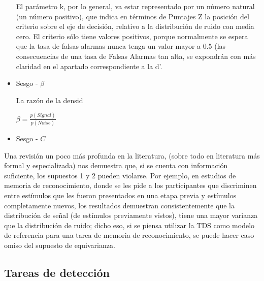 \begin{itemize}
 El parámetro k, por lo general, va estar representado por un número natural (un número positivo), que indica en términos de Puntajes Z  la posición del criterio sobre el eje de decisión, relativo a la distribución de ruido con media cero. El criterio sólo tiene valores positivos, porque normalmente se espera que la tasa de falsas alarmas nunca tenga un valor mayor a 0.5 (las consecuencias de una tasa de Falsas Alarmas tan alta, se expondrán con más claridad en el apartado correspondiente a la d’. \\


\item Sesgo - $\beta$

La razón de la densid

$\beta = \frac{p(Signal)}{p(Noise)}$


\item Sesgo - $C$


\end{itemize}



Una revisión un poco más profunda en la literatura, (sobre todo en literatura más formal y especializada) nos demuestra que, si se cuenta con información suficiente, los supuestos 1 y 2 pueden violarse. Por ejemplo, en estudios de memoria de reconocimiento, donde se les pide a los participantes que discriminen entre estímulos que les fueron presentados en una etapa previa y estímulos completamente nuevos,  los resultados demuestran consistentemente que la distribución de señal (de estímulos previamente vistos), tiene una mayor varianza que la distribución de ruido; dicho eso, si se piensa utilizar la TDS como modelo de referencia para una tarea de memoria de reconocimiento, se puede hacer caso omiso del supuesto de equivarianza.\\


\subsection{Tareas de detección}

